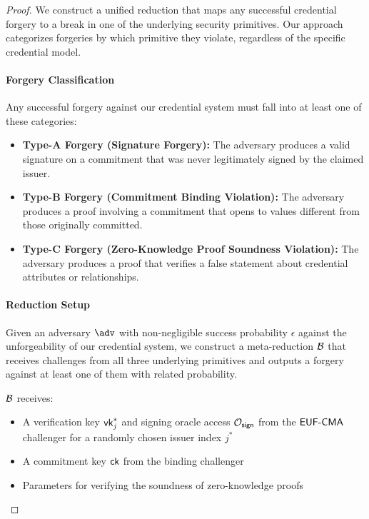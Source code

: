 \begin{proof}
We construct a unified reduction that maps any successful credential forgery to a break in one of the underlying security primitives. Our approach categorizes forgeries by which primitive they violate, regardless of the specific credential model.

\paragraph{Forgery Classification}
Any successful forgery against our credential system must fall into at least one of these categories:

\begin{itemize}
    \item \textbf{Type-A Forgery (Signature Forgery):} The adversary produces a valid signature on a commitment that was never legitimately signed by the claimed issuer.
    
    \item \textbf{Type-B Forgery (Commitment Binding Violation):} The adversary produces a proof involving a commitment that opens to values different from those originally committed.
    
    \item \textbf{Type-C Forgery (Zero-Knowledge Proof Soundness Violation):} The adversary produces a proof that verifies a false statement about credential attributes or relationships.
\end{itemize}

\paragraph{Reduction Setup}
Given an adversary $\adv$ with non-negligible success probability $\epsilon$ against the unforgeability of our credential system, we construct a meta-reduction $\mathcal{B}$ that receives challenges from all three underlying primitives and outputs a forgery against at least one of them with related probability.

$\mathcal{B}$ receives:
\begin{itemize}
    \item A verification key $\mathsf{vk}_j^*$ and signing oracle access $\mathcal{O}_{\mathsf{sign}}$ from the $\mathsf{EUF\text{-}CMA}$ challenger for a randomly chosen issuer index $j^*$
    \item A commitment key $\mathsf{ck}$ from the binding challenger
    \item Parameters for verifying the soundness of zero-knowledge proofs
\end{itemize}


\end{proof}
